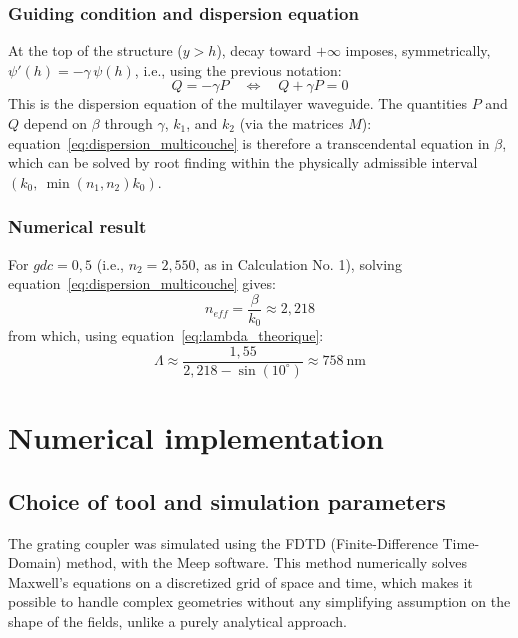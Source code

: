 \documentclass[a4paper,11pt]{report}
\begin{document}
\subsection*{Guiding condition and dispersion equation}

At the top of the structure ($y>h$), decay toward $+\infty$ imposes, symmetrically, $\psi'(h)=-\gamma\,\psi(h)$, i.e., using the previous notation:
\begin{equation}
Q = -\gamma P \quad\Longleftrightarrow\quad Q+\gamma P = 0
\label{eq:dispersion_multicouche}
\end{equation}
This is the dispersion equation of the multilayer waveguide. The quantities $P$ and $Q$ depend on $\beta$ through $\gamma$, $k_1$, and $k_2$ (via the matrices $M$): equation~\eqref{eq:dispersion_multicouche} is therefore a transcendental equation in $\beta$, which can be solved by root finding within the physically admissible interval $\left(k_0,\ \min(n_1,n_2)k_0\right)$.

\subsection*{Numerical result}

For $gdc=0{,}5$ (i.e., $n_2=2{,}550$, as in Calculation No. 1), solving equation~\eqref{eq:dispersion_multicouche} gives:
\begin{equation}
n_{eff} = \frac{\beta}{k_0} \approx 2{,}218
\end{equation}
from which, using equation~\eqref{eq:lambda_theorique}:
\begin{equation}
\Lambda \approx \frac{1{,}55}{2{,}218-\sin(10^\circ)} \approx 758~\text{nm}
\end{equation}



\chapter{Numerical implementation}
\label{ch:numerique}

\section{Choice of tool and simulation parameters}

The grating coupler was simulated using the FDTD (Finite-Difference Time-Domain) method, with the Meep software. This method numerically solves Maxwell's equations on a discretized grid of space and time, which makes it possible to handle complex geometries without any simplifying assumption on the shape of the fields, unlike a purely analytical approach.
\end{document}
